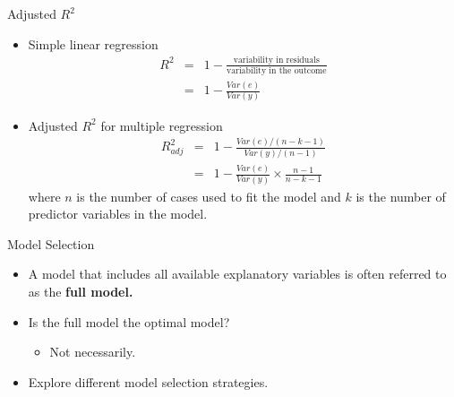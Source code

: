 \documentclass[12pt,a4paper]{beamer}
\begin{document}
	\begin{frame}{Adjusted $R^2$}
		\small\begin{itemize}
			\item Simple linear regression
			\begin{eqnarray*}
			R^2& =& 1 - \frac{\text{variability in residuals}}{\text{variability in the outcome}}\\
				&=& 1 - \frac{Var(e)}{Var(y)}
			\end{eqnarray*}
			\item Adjusted $R^2$ for multiple regression
			\begin{eqnarray*}
			R_{adj}^{2} &=& 1-\frac{Var(e) / (n-k-1)}{Var(y) / (n-1)}\\
				&=& 1-\frac{Var(e)}{Var(y)} \times \frac{n-1}{n-k-1}
			\end{eqnarray*}
			where $n$ is the number of cases used to fit the model and $k$ is the number of predictor variables in the model.
		\end{itemize}
	\end{frame}
	\begin{frame}{Model Selection}
		\begin{itemize}
			\item A model that includes all available explanatory variables is often referred to as the \textbf{full model.}
			\item Is the full model the optimal model?
			\begin{itemize}
				\item Not necessarily. 
			\end{itemize}
			\item Explore different model selection strategies.
		\end{itemize}
	\end{frame}
\end{document}
